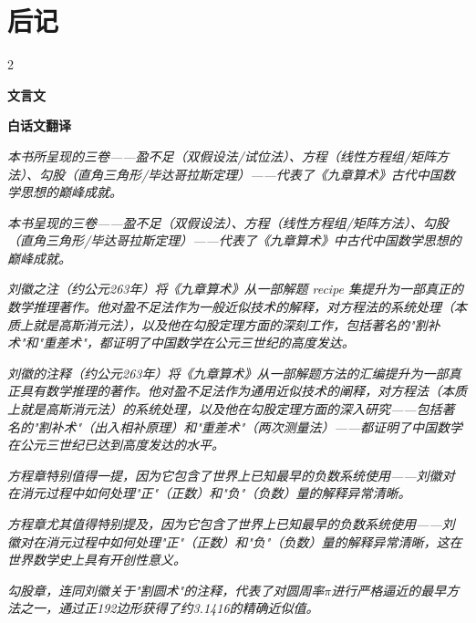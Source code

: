 \documentclass[10pt,a4paper]{article}
\newcommand{\classicalheader}[1]{{\centering\large\bfseries\color{classicalcolor} #1\par\vspace{0.5em}}}
\newcommand{\modernheader}[1]{{\centering\large\bfseries\color{moderncolor} #1\par\vspace{0.5em}}}
\begin{document}
\vspace{0.5cm}

\newpage
\section*{后记}

\begin{paracol}{2}
\classicalheader{文言文}
\switchcolumn
\modernheader{白话文翻译}
\switchcolumn*

\textit{本书所呈现的三卷——盈不足（双假设法/试位法）、方程（线性方程组/矩阵方法）、勾股（直角三角形/毕达哥拉斯定理）——代表了《九章算术》古代中国数学思想的巅峰成就。}

\switchcolumn

\textit{本书呈现的三卷——盈不足（双假设法）、方程（线性方程组/矩阵方法）、勾股（直角三角形/毕达哥拉斯定理）——代表了《九章算术》中古代中国数学思想的巅峰成就。}

\switchcolumn*

\textit{刘徽之注（约公元263年）将《九章算术》从一部解题 recipe 集提升为一部真正的数学推理著作。他对盈不足法作为一般近似技术的解释，对方程法的系统处理（本质上就是高斯消元法），以及他在勾股定理方面的深刻工作，包括著名的"割补术"和"重差术"，都证明了中国数学在公元三世纪的高度发达。}

\switchcolumn

\textit{刘徽的注释（约公元263年）将《九章算术》从一部解题方法的汇编提升为一部真正具有数学推理的著作。他对盈不足法作为通用近似技术的阐释，对方程法（本质上就是高斯消元法）的系统处理，以及他在勾股定理方面的深入研究——包括著名的"割补术"（出入相补原理）和"重差术"（两次测量法）——都证明了中国数学在公元三世纪已达到高度发达的水平。}

\switchcolumn*

\textit{方程章特别值得一提，因为它包含了世界上已知最早的负数系统使用——刘徽对在消元过程中如何处理"正"（正数）和"负"（负数）量的解释异常清晰。}

\switchcolumn

\textit{方程章尤其值得特别提及，因为它包含了世界上已知最早的负数系统使用——刘徽对在消元过程中如何处理"正"（正数）和"负"（负数）量的解释异常清晰，这在世界数学史上具有开创性意义。}

\switchcolumn*

\textit{勾股章，连同刘徽关于"割圆术"的注释，代表了对圆周率$\pi$进行严格逼近的最早方法之一，通过正192边形获得了约3.1416的精确近似值。}


\end{paracol}
\end{document}
